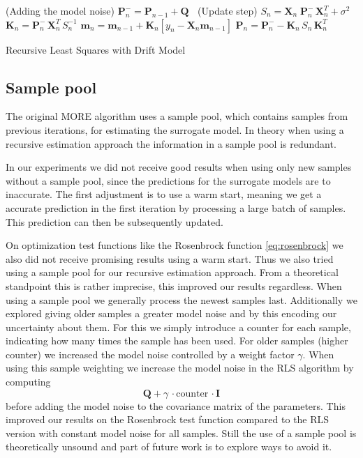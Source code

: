 \begin{algorithm}[H]
\renewcommand{\algorithmcfname}{Algorithm}
\DontPrintSemicolon
\SetAlgoLined
{}

{
  \Begin(Adding the model noise)
  {
    $\mathbf{P}_n^- = \mathbf{P}_{n-1} + \mathbf{Q}$ \;
  }
  $~$ \;
  \Begin(Update step)
  {
    $S_n = \mathbf{X}_n \; \mathbf{P}_n^- \, \mathbf{X}_n^T + \sigma^2$ \;
    $\textbf{K}_n = \textbf{P}_{n}^{-} \, \textbf{X}^T_n \, S_n^{-1}$ \;
    $\textbf{m}_n = \textbf{m}_{n-1} + \textbf{K}_n [y_n - \textbf{X}_n \textbf{m}_{n-1}]$ \;
    $\textbf{P}_n = \textbf{P}_{n}^{-} - \textbf{K}_n \, S_n \, \textbf{K}_n^T $ \;
  }
}
\caption{Recursive Least Squares with Drift Model}
\label{RLS:basic}
\end{algorithm}
  
\subsection{Sample pool}
The original MORE algorithm uses a sample pool, which contains samples
from previous iterations, for estimating the surrogate model.
In theory when using a recursive estimation approach
the information in a sample pool is redundant.

In our experiments we did not receive good results when
using only new samples without a sample pool, since
the predictions for the surrogate models are to inaccurate.
The first adjustment is to use a warm start, meaning we get
a accurate prediction in the first iteration by processing
a large batch of samples. This prediction can then be subsequently
updated.

On optimization test functions like the Rosenbrock
function \cref{eq:rosenbrock} we also did not receive
promising results using a warm start.
Thus we also tried using a sample pool for our recursive estimation approach.
From a theoretical standpoint this is rather imprecise,
this improved our results regardless.
When using a sample pool we generally process the newest samples
last.
Additionally we explored giving older samples 
a greater model noise and by this encoding our uncertainty about them.
For this we simply introduce a counter for each sample,
indicating how many times the sample has been used.
For older samples (higher counter) we increased the model noise controlled
by a weight factor $\gamma$.
When using this sample weighting we increase the model noise in the
RLS algorithm by computing
$$ \mathbf{Q} + \gamma \,\cdot \text{counter} \, \cdot \mathbf{I} $$
before adding the model noise to the covariance
matrix of the parameters.
This improved our results on the Rosenbrock test function compared
to the RLS version with constant model noise for all samples.
Still the use of a sample pool is theoretically unsound and part
of future work is to explore ways to avoid it.

